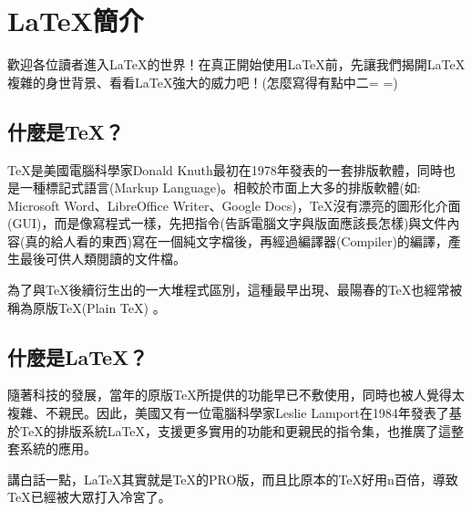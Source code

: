 \documentclass{../indiv}
\begin{document}
	\onlyifstandalone{\makebarother}
	\chapter{\LaTeX 簡介}
	歡迎各位讀者進入\LaTeX 的世界！在真正開始使用\LaTeX 前，先讓我們揭開\LaTeX 複雜的身世背景、看看\LaTeX 強大的威力吧！(怎麼寫得有點中二= =)
	
	\section{什麼是\TeX ？}
	\TeX 是美國電腦科學家Donald Knuth最初在1978年發表的一套排版軟體，同時也是一種標記式語言(Markup Language)。相較於市面上大多的排版軟體(如: Microsoft Word、LibreOffice Writer、Google Docs)，\TeX 沒有漂亮的圖形化介面(GUI)，而是像寫程式一樣，先把指令(告訴電腦文字與版面應該長怎樣)與文件內容(真的給人看的東西)寫在一個純文字檔後，再經過編譯器(Compiler)的編譯，產生最後可供人類閱讀的文件檔。
	
	為了與\TeX 後續衍生出的一大堆程式區別，這種最早出現、最陽春的\TeX 也經常被稱為原版\TeX (Plain \TeX) 。
	
	\section{什麼是\LaTeX ？}
	隨著科技的發展，當年的原版\TeX 所提供的功能早已不敷使用，同時也被人覺得太複雜、不親民。因此，美國又有一位電腦科學家Leslie Lamport在1984年發表了基於\TeX 的排版系統\LaTeX ，支援更多實用的功能和更親民的指令集，也推廣了這整套系統的應用。 
	
	講白話一點，\LaTeX 其實就是\TeX 的PRO版，而且比原本的\TeX 好用n百倍，導致\TeX 已經被大眾打入冷宮了。
	
	\newpage
\end{document}
